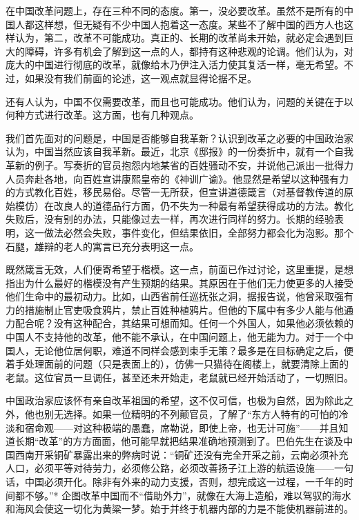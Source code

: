 \documentclass[12pt,oneside]{book}
\begin{document}
\begin{common-format}
在中国改革问题上，存在三种不同的态度。第一，没必要改革。虽然不是所有的中国人都这样想，但无疑有不少中国人抱着这一态度。某些不了解中国的西方人也这样认为，第二，改革不可能成功。真正的、长期的改革尚未开始，就必定会遇到巨大的障碍，许多有机会了解到这一点的人，都持有这种悲观的论调。他们认为，对庞大的中国进行彻底的改革，就像给木乃伊注入活力使其复活一样，毫无希望。不过，如果没有我们前面的论述，这一观点就显得论据不足。 

还有人认为，中国不仅需要改革，而且也可能成功。他们认为，问题的关键在于以何种方式进行改革。这方面，也有几种观点。 

我们首先面对的问题是，中国是否能够自我革新？认识到改革之必要的中国政治家认为，中国当然应该自我革新。最近，北京《邸报》的一份奏折中，就有一个自我革新的例子。写奏折的官员抱怨内地某省的百姓骚动不安，并说他己派出一批得力人员奔赴各地，向百姓宣讲康熙皇帝的《神训广谕》。他显然是希望以这种强有力的方式教化百姓，移民易俗。尽管一无所获，但宣讲道德箴言（对基督教传道的原始模仿）在改良人的道德品行方面，仍不失为一种最有希望获得成功的方法。教化失败后，没有别的办法，只能像过去一样，再次进行同样的努力。长期的经验表明，这一做法必然会失败，事件变化，但结果依旧，全部努力都会化为泡影。那个石腿，雄辩的老人的寓言已充分表明这一点。 

既然箴言无效，人们便寄希望于楷模。这一点，前面已作过讨论，这里重提，是想指出为什么最好的楷模没有产生预期的结果。其原因在于他们无力使更多的人接受他们生命中的最初动力。比如，山西省前任巡抚张之洞，据报告说，他曾采取强有力的措施制止官吏吸食鸦片，禁止百姓种植鸦片。但他的下属中有多少人能与他通力配合呢？没有这种配合，其结果可想而知。任何一个外国人，如果他必须依赖的中国人不支持他的改革，他不能不承认，在中国问题上，他无能为力。对于一个中国人，无论他位居何职，难道不同样会感到束手无策？最多是在目标确定之后，便着手处理面前的问题（只是表面上的），仿佛一只猫待在阁楼上，就要清除上面的老鼠。这位官员一旦调任，甚至还未开始走，老鼠就已经开始活动了，一切照旧。 

中国政治家应该怀有亲自改革祖国的希望，这不仅可信，也极为自然，因为除此之外，他也别无选择。如果一位精明的不列颠官员，了解了“东方人特有的可怕的冷淡和宿命观——对这种极端的愚蠢，席勒说，即使上帝，也无计可施”——并且知道长期“改革”的方方面面，他可能早就把结果准确地预测到了。巴伯先生在谈及中国西南开采铜矿暴露出来的弊病时说：“铜矿还没有完全开采之前，云南必须补充人口，必须平等对待劳力，必须修公路，必须改善扬子江上游的航运设施——一句话，中国必须开化。除非有外来的动力支援，否则，想完成这一过程，一千年的时间都不够。”* 企图改革中国而不“借助外力”，就像在大海上造船，难以驾驭的海水和海风会使这一切化为黄粱一梦。始于并终于机器内部的力是不能使机器前进的。 


\end{common-format}
\end{document}
